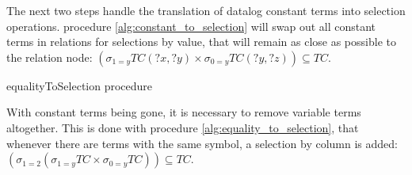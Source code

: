 \documentclass[manuscript,screen,review]{acmart}
\theoremstyle{definition}
\begin{document}
The next two steps handle the translation of datalog constant terms into selection operations. procedure \ref{alg:constant_to_selection} will swap out
all constant terms in relations for selections by value, that will remain as close as possible to the relation node: $(\sigma_{1=y}TC(?x, ?y) \times \sigma_{0=y}TC(?y, ?z)) \subseteq TC$.

\begin{algorithm}
	\scriptsize
	\BlankLine

	\caption{equalityToSelection procedure}
	\label{alg:equality_to_selection}
\end{algorithm}

With constant terms being gone, it is necessary to remove variable terms altogether. This is done with procedure \ref{alg:equality_to_selection}, that
whenever there are terms with the same symbol, a selection by column is added: $(\sigma_{1=2}(\sigma_{1=y}TC \times \sigma_{0=y}TC)) \subseteq TC$.
\end{document}
